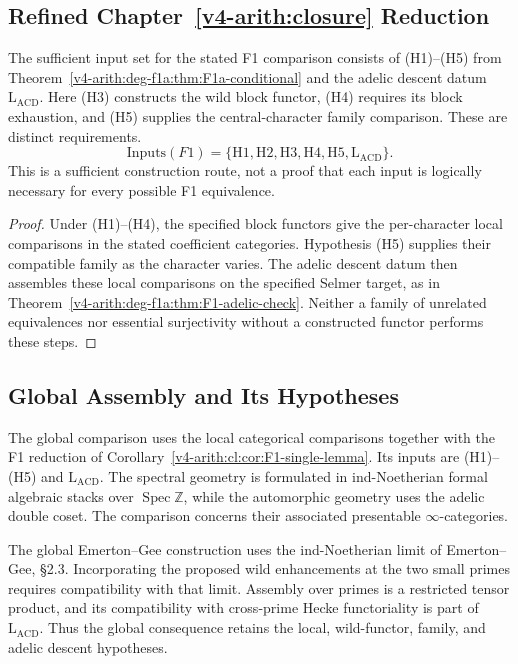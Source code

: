 \subsection{Refined Chapter~\ref{v4-arith:closure} Reduction}

\begin{proposition}
\label{v4-arith:deg-f1a:prop:F1-reduction-updated}
The sufficient input set for the stated F1 comparison consists of
(H1)--(H5) from Theorem~\ref{v4-arith:deg-f1a:thm:F1a-conditional}
and the adelic descent datum \(\mathrm L_{\mathrm{ACD}}\).
Here (H3) constructs the wild block functor, (H4) requires its
block exhaustion, and (H5) supplies the central-character family
comparison. These are distinct requirements.
\[
 \mathrm{Inputs}(F1)=
 \{\mathrm{H1},\mathrm{H2},\mathrm{H3},\mathrm{H4},\mathrm{H5},
       \mathrm L_{\mathrm{ACD}}\}.
\]
This is a sufficient construction route, not a proof that each input
is logically necessary for every possible F1 equivalence.
\end{proposition}
\begin{proof}
Under (H1)--(H4), the specified block functors give the per-character
local comparisons in the stated coefficient categories. Hypothesis
(H5) supplies their compatible family as the character varies.
The adelic descent datum then assembles these local comparisons on
the specified Selmer target, as in
Theorem~\ref{v4-arith:deg-f1a:thm:F1-adelic-check}.
Neither a family of unrelated equivalences nor essential
surjectivity without a constructed functor performs these steps.
\end{proof}

\subsection{Global Assembly and Its Hypotheses}

The global comparison uses the local categorical comparisons together
with the F1 reduction of Corollary~\ref{v4-arith:cl:cor:F1-single-lemma}.
Its inputs are (H1)--(H5) and \(\mathrm L_{\mathrm{ACD}}\).
The spectral geometry is formulated in ind-Noetherian formal algebraic
stacks over \(\operatorname{Spec}\mathbb Z\), while the automorphic
geometry uses the adelic double coset. The comparison concerns their
associated presentable \(\infty\)-categories.

The global Emerton--Gee construction uses the ind-Noetherian limit
of Emerton--Gee, \S2.3. Incorporating the proposed wild enhancements
at the two small primes requires compatibility with that limit.
Assembly over primes is a restricted tensor product, and its
compatibility with cross-prime Hecke functoriality is part of
\(\mathrm L_{\mathrm{ACD}}\). Thus the global consequence retains the
local, wild-functor, family, and adelic descent hypotheses.

